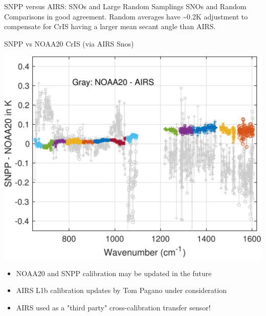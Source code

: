 \documentclass[10pt,t]{beamer}
\begin{document}
\begin{frame}[label={sec:org15986a2}]{SNPP versus AIRS: SNOs and Large Random Samplings}
\small
SNOs and Random Comparisons in good agreement.  Random averages have \textasciitilde{}0.2K adjustment to compensate for CrIS having a larger mean secant angle than AIRS.
\end{frame}

\begin{frame}[label={sec:org25f2e50}]{SNPP vs NOAA20 CrIS (via AIRS Snos)}
\vspace{-0.1in}

\begin{center}
\includegraphics[width=0.65\linewidth]{./Figs/Pdf/sno_march2018_snpp_minus_noaa20_with_c2_airs_ingrey.pdf}
\end{center}

\vspace{-0.1in}

\small
\begin{itemize}
\item NOAA20 and SNPP calibration may be updated in the future
\item AIRS L1b calibration updates by Tom Pagano under consideration
\item AIRS used as a "third party" cross-calibration transfer sensor!
\end{itemize}
\end{frame}
\end{document}
